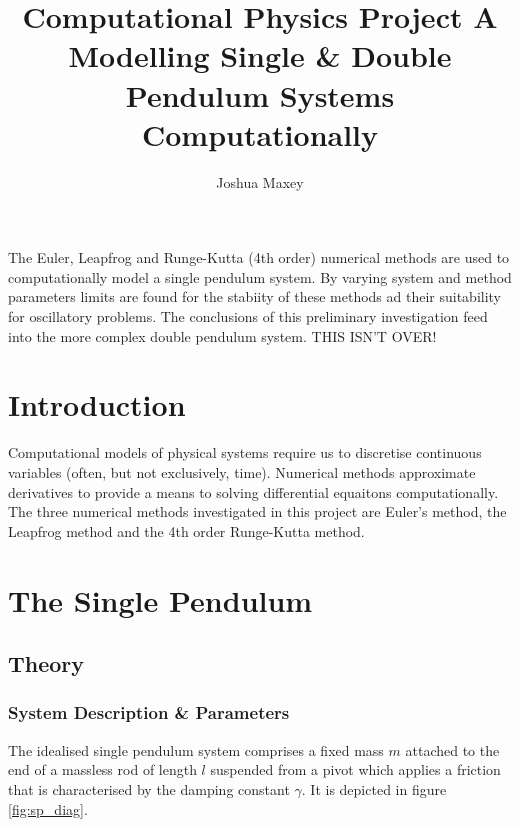 \documentclass[11pt]{article}
\title{Computational Physics Project A \\ Modelling Single \& Double Pendulum Systems Computationally}
\author{Joshua Maxey}
\begin{document}
\maketitle

\begin{center}
The Euler, Leapfrog and Runge-Kutta (4th order) numerical methods are used to computationally model a single pendulum system. By varying system and method parameters limits are found for the stabiity of these methods ad their suitability for oscillatory problems. The conclusions of this preliminary investigation feed into the more complex double pendulum system. THIS ISN'T OVER!
\end{center}

\tableofcontents
\pagebreak

\section{Introduction}
Computational models of physical systems require us to discretise continuous variables (often, but not exclusively, time). Numerical methods approximate derivatives to provide a means to solving differential equaitons computationally. The three numerical methods investigated in this project are Euler's method, the Leapfrog method and the 4th order Runge-Kutta method.

\section{The Single Pendulum}
\subsection{Theory}
\subsubsection*{System Description \& Parameters}
The idealised single pendulum system comprises a fixed mass $m$ attached to the end of a massless rod of length $l$ suspended from a pivot which applies a friction that is characterised by the damping constant $\gamma$. It is depicted in figure \ref{fig:sp_diag}.
\end{document}
